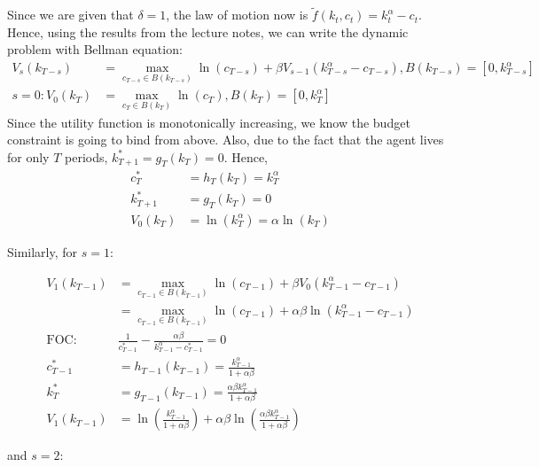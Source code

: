\documentclass[]{article}
\begin{document}
Since we are given that $\delta = 1$, the law of motion now is $\tilde{f}(k_t, c_t) = k_t^\alpha - c_t$. Hence, using the results from the lecture notes, we can write the dynamic problem with Bellman equation:
\begin{equation}
	\begin{split}
	V_s(k_{T-s})& = \max\limits_{c_{T-s}\in B(k_{T-s})}\ln(c_{T-s}) + \beta V_{s-1}(k_{T-s}^\alpha - c_{T-s}), B(k_{T-s}) = [0, k_{T-s}^\alpha] \\ \nonumber
	s = 0: V_0(k_{T})& = \max\limits_{c_{T}\in B(k_{T})}\ln(c_{T}), B(k_{T}) = [0, k_{T}^\alpha]
	\end{split}
\end{equation}
Since the utility function is monotonically increasing, we know the budget constraint is going to bind from above. Also, due to the fact that the agent lives for only $T$ periods, $k_{T+1}^* = g_T(k_T) = 0$. Hence,
\begin{equation}
	\begin{split}
	c_{T}^*& = h_T(k_T) = k_{T}^\alpha \\ \nonumber
	k_{T+1}^*& = g_T(k_T) = 0 \\
	V_0(k_T)& = \ln(k_{T}^\alpha) = \alpha\ln(k_T)
	\end{split}
\end{equation}

Similarly, for $s=1$:

\begin{equation}
\begin{split}
V_1(k_{T-1})& = \max\limits_{c_{T-1}\in B(k_{T-1})}\ln(c_{T-1}) + \beta V_{0}(k_{T-1}^\alpha - c_{T-1}) \\ \nonumber
& = \max\limits_{c_{T-1}\in B(k_{T-1})}\ln(c_{T-1}) + \alpha\beta\ln(k_{T-1}^\alpha - c_{T-1})\\
\text{FOC: }& \frac{1}{c_{T-1}^*}-\frac{\alpha\beta}{k_{T-1}^\alpha - c_{T-1}^*} = 0 \\
c_{T-1}^*& = h_{T-1}(k_{T-1}) = \frac{k_{T-1}^\alpha}{1+\alpha\beta} \\
k_{T}^*& = g_{T-1}(k_{T-1}) = \frac{\alpha\beta k_{T-1}^\alpha}{1+\alpha\beta} \\
V_1(k_{T-1})& = \ln(\frac{k_{T-1}^\alpha}{1+\alpha\beta}) + \alpha\beta\ln(\frac{\alpha\beta k_{T-1}^\alpha}{1+\alpha\beta})
\end{split}
\end{equation}

and $s = 2$:
\end{document}
